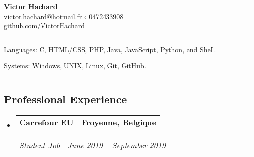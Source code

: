 \documentclass[10pt,letterpaper]{article}
\makeatletter
\newenvironment{indentsection}[1]
{\begin{list}{}
  {\setlength{\leftmargin}{#1}} \item[]
}
{\end{list}}
\newcommand{\headerrow}[2]
{\begin{tabular*}{\linewidth}{l@{\extracolsep{\fill}}r}
  #1 &
  #2 \\
\end{tabular*}}
\makeatother
\begin{document}
\begin{center}
  \huge \textbf{Victor Hachard} \\
  \large
  victor.hachard@hotmail.fr
  $\circ$
  0472433908
  \\
  github.com/VictorHachard
  \vspace{-0.2em}
\end{center}


\hrule
\begin{indentsection}{\parindent}
\begin{description*}
  \item[Languages:] C, HTML/CSS, PHP, Java, JavaScript, Python, and Shell.
  \item[Systems:] Windows, UNIX, Linux, Git, GitHub.
\end{description*}
\end{indentsection}


\hrule
\vspace{-0.4em}
\subsection*{Professional Experience}
\begin{itemize}
  \parskip=0.1em

  \item
  \headerrow
    {\textbf{Carrefour EU}}
    {\textbf{Froyenne, Belgique}}
  \headerrow
    {\emph{Student Job}}
    {\emph{June 2019 -- September 2019}}

  \end{itemize}


%
%
%
\end{document}
